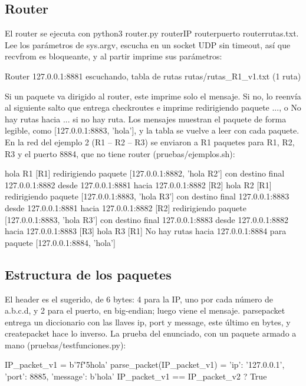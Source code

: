 \documentclass[
	spanish, %
	letterpaper, oneside
]{article}
\newcommand{\codeunderscore}{\textunderscore\allowbreak}
\newcommand{\code}[1]{{\let\_\codeunderscore#1}}     %
\newcommand{\field}[1]{#1}    %
\begin{document}
\subsection{Router}
El router se ejecuta con \code{python3 router.py router\_IP router\_puerto router\_rutas.txt}. Lee los parámetros de \code{sys.argv}, escucha en un socket UDP sin timeout, así que \code{recvfrom} es bloqueante, y al partir imprime sus parámetros:
\begin{salida}
Router 127.0.0.1:8881 escuchando, tabla de rutas rutas/rutas_R1_v1.txt (1 ruta)
\end{salida}
Si un paquete va dirigido al router, este imprime solo el mensaje. Si no, lo reenvía al siguiente salto que entrega \code{check\_routes} e imprime \code{redirigiendo paquete ...}, o \code{No hay rutas hacia ...} si no hay ruta. Los mensajes muestran el paquete de forma legible, como [127.0.0.1:8883, 'hola'], y la tabla se vuelve a leer con cada paquete. En la red del ejemplo 2 (R1 -- R2 -- R3) se enviaron a R1 paquetes para R1, R2, R3 y el puerto 8884, que no tiene router (\code{pruebas/ejemplos.sh}):
\begin{salida}
[R1] hola R1
[R1] redirigiendo paquete [127.0.0.1:8882, 'hola R2'] con destino final 127.0.0.1:8882 desde 127.0.0.1:8881 hacia 127.0.0.1:8882
[R2] hola R2
[R1] redirigiendo paquete [127.0.0.1:8883, 'hola R3'] con destino final 127.0.0.1:8883 desde 127.0.0.1:8881 hacia 127.0.0.1:8882
[R2] redirigiendo paquete [127.0.0.1:8883, 'hola R3'] con destino final 127.0.0.1:8883 desde 127.0.0.1:8882 hacia 127.0.0.1:8883
[R3] hola R3
[R1] No hay rutas hacia 127.0.0.1:8884 para paquete [127.0.0.1:8884, 'hola']
\end{salida}

\subsection{Estructura de los paquetes}
El header es el sugerido, de 6 bytes: 4 para la IP, uno por cada número de a.b.c.d, y 2 para el puerto, en big-endian; luego viene el mensaje. \code{parse\_packet} entrega un diccionario con las llaves \field{ip}, \field{port} y \field{message}, este último en bytes, y \code{create\_packet} hace lo inverso. La prueba del enunciado, con un paquete armado a mano (\code{pruebas/test\_funciones.py}):
\begin{salida}
IP_packet_v1 = b'\x7f"\xb5hola'
parse_packet(IP_packet_v1) = {'ip': '127.0.0.1', 'port': 8885, 'message': b'hola'}
IP_packet_v1 == IP_packet_v2 ? True
\end{salida}
\end{document}
